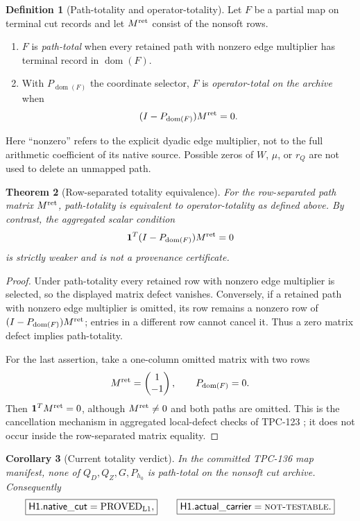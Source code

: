 \documentclass[11pt]{article}
\newtheorem{theorem}{Theorem}[section]
\newtheorem{corollary}[theorem]{Corollary}
\theoremstyle{definition}
\newtheorem{definition}[theorem]{Definition}
\theoremstyle{remark}
\newcommand{\one}{\mathbf 1}
\newcommand{\Dom}{\operatorname{dom}}
\newcommand{\Lone}{\mathrm{L1}}
\begin{document}
\begin{definition}[Path-totality and operator-totality]
Let \(F\) be a partial map on terminal cut records and let
\(M^{\rm ret}\) consist of the nonsoft rows.
\begin{enumerate}[label=(\alph*),leftmargin=2.2em]
\item \(F\) is \emph{path-total} when every retained path with
nonzero edge multiplier has terminal record in \(\Dom(F)\).
\item With \(P_{\Dom(F)}\) the coordinate selector, \(F\) is
\emph{operator-total on the archive} when
\[
 (I-P_{\Dom(F)})M^{\rm ret}=0.
\]
\end{enumerate}
\end{definition}

Here ``nonzero'' refers to the explicit dyadic edge multiplier, not
to the full arithmetic coefficient of its native source.  Possible
zeros of \(W\), \(\mu\), or \(r_Q\) are not used to delete an
unmapped path.

\begin{theorem}[Row-separated totality equivalence]
\label{thm:totality}
For the row-separated path matrix \(M^{\rm ret}\), path-totality is
equivalent to operator-totality as defined above.  By contrast, the
aggregated scalar condition
\[
 \one^T(I-P_{\Dom(F)})M^{\rm ret}=0
\]
is strictly weaker and is not a provenance certificate.
\end{theorem}

\begin{proof}
Under path-totality every retained row with nonzero edge multiplier is
selected, so the
displayed matrix defect vanishes.  Conversely, if a retained path
with nonzero edge multiplier is omitted, its row remains a nonzero row
of \((I-P_{\Dom(F)})M^{\rm ret}\); entries in a different row cannot
cancel it.  Thus a zero matrix defect implies path-totality.

For the last assertion, take a one-column omitted matrix with two rows
\[
 M^{\rm ret}=\begin{pmatrix}1\\-1\end{pmatrix},\qquad P_{\Dom(F)}=0.
\]
Then \(\one^TM^{\rm ret}=0\), although \(M^{\rm ret}\ne0\) and both
paths are omitted.  This is the cancellation mechanism in aggregated
local-defect checks of TPC-123 \citep{WangTPC123}; it does not occur
inside the row-separated matrix equality.
\end{proof}

\begin{corollary}[Current totality verdict]
\label{cor:verdict}
In the committed TPC-136 map manifest, none of
\(Q_D,Q_Z,G,P_{h_0}\) is path-total on the nonsoft cut archive.
Consequently
\[
 \boxed{\mathsf{H1.native\_cut}=\mathrm{PROVED}_{\Lone},}
\qquad
 \boxed{\mathsf{H1.actual\_carrier}
 =\text{\normalfont\textsc{not-testable}}.}
\]
\end{corollary}
\end{document}
